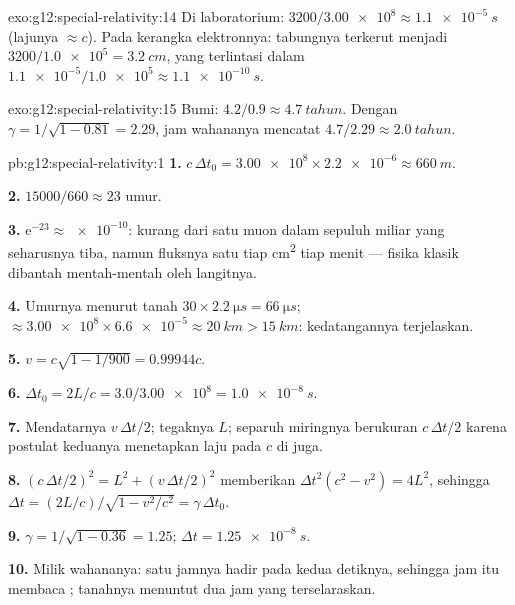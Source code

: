 \begin{solution}{exo:g12:special-relativity:14}
Di laboratorium: $3200/\num{3.00e8} \approx \qty{1.1e-5}{s}$ (lajunya
$\approx c$). Pada kerangka elektronnya: tabungnya terkerut menjadi
$3200/\num{1.0e5} = \qty{3.2}{cm}$, yang terlintasi dalam
$\num{1.1e-5}/\num{1.0e5} \approx \qty{1.1e-10}{s}$.
\end{solution}

\begin{solution}{exo:g12:special-relativity:15}
Bumi: $4.2/0.9 \approx \qty{4.7}{tahun}$. Dengan
$\gamma = 1/\sqrt{1 - 0.81} = 2.29$, jam wahananya mencatat
$4.7/2.29 \approx \qty{2.0}{tahun}$.
\end{solution}

\begin{solution}{pb:g12:special-relativity:1}
\textbf{1.} $c\,\Delta t_0 = \num{3.00e8} \times \num{2.2e-6} \approx
\qty{660}{m}$.

\textbf{2.} $\num{15000}/660 \approx 23$ umur.

\textbf{3.} $\mathrm{e}^{-23} \approx \num{e-10}$: kurang dari satu muon
dalam sepuluh miliar yang seharusnya tiba, namun fluksnya satu tiap \unit{cm^2} tiap
menit --- fisika klasik dibantah mentah-mentah oleh langitnya.

\textbf{4.} Umurnya menurut tanah $30 \times \qty{2.2}{\micro s} =
\qty{66}{\micro s}$;  $\approx \num{3.00e8} \times \num{6.6e-5}
\approx \qty{20}{km} > \qty{15}{km}$: kedatangannya terjelaskan.

\textbf{5.} $v = c\sqrt{1 - 1/900} = 0.99944c$.

\textbf{6.} $\Delta t_0 = 2L/c = 3.0/\num{3.00e8} = \qty{1.0e-8}{s}$.

\textbf{7.} Mendatarnya $v\,\Delta t/2$; tegaknya $L$; separuh 
miringnya berukuran $c\,\Delta t/2$ karena postulat keduanya menetapkan
laju  pada $c$ di  juga.

\textbf{8.} $(c\,\Delta t/2)^2 = L^2 + (v\,\Delta t/2)^2$ memberikan
$\Delta t^2(c^2 - v^2) = 4L^2$, sehingga $\Delta t =
(2L/c)/\sqrt{1 - v^2/c^2} = \gamma\,\Delta t_0$.

\textbf{9.} $\gamma = 1/\sqrt{1 - 0.36} = 1.25$;
$\Delta t = \qty{1.25e-8}{s}$.

\textbf{10.} Milik wahananya: satu jamnya hadir pada kedua detiknya, sehingga jam itu
membaca ; tanahnya menuntut dua jam yang terselaraskan.


\end{solution}
